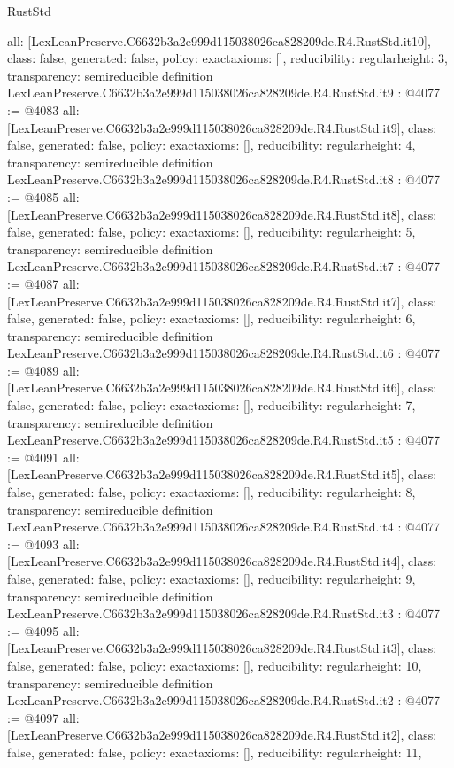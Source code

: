 \begin{lexlean}{RustStd}
\begin{coremodule}
{  all: [LexLeanPreserve.C6632b3a2e999d115038026ca828209de.R4.RustStd.it10],
  class: false,
  generated: false,
  policy: exact{axioms: []},
  reducibility: regular{height: 3},
  transparency: semireducible
}
definition LexLeanPreserve.C6632b3a2e999d115038026ca828209de.R4.RustStd.it9 : @4077 := @4083 {
  all: [LexLeanPreserve.C6632b3a2e999d115038026ca828209de.R4.RustStd.it9],
  class: false,
  generated: false,
  policy: exact{axioms: []},
  reducibility: regular{height: 4},
  transparency: semireducible
}
definition LexLeanPreserve.C6632b3a2e999d115038026ca828209de.R4.RustStd.it8 : @4077 := @4085 {
  all: [LexLeanPreserve.C6632b3a2e999d115038026ca828209de.R4.RustStd.it8],
  class: false,
  generated: false,
  policy: exact{axioms: []},
  reducibility: regular{height: 5},
  transparency: semireducible
}
definition LexLeanPreserve.C6632b3a2e999d115038026ca828209de.R4.RustStd.it7 : @4077 := @4087 {
  all: [LexLeanPreserve.C6632b3a2e999d115038026ca828209de.R4.RustStd.it7],
  class: false,
  generated: false,
  policy: exact{axioms: []},
  reducibility: regular{height: 6},
  transparency: semireducible
}
definition LexLeanPreserve.C6632b3a2e999d115038026ca828209de.R4.RustStd.it6 : @4077 := @4089 {
  all: [LexLeanPreserve.C6632b3a2e999d115038026ca828209de.R4.RustStd.it6],
  class: false,
  generated: false,
  policy: exact{axioms: []},
  reducibility: regular{height: 7},
  transparency: semireducible
}
definition LexLeanPreserve.C6632b3a2e999d115038026ca828209de.R4.RustStd.it5 : @4077 := @4091 {
  all: [LexLeanPreserve.C6632b3a2e999d115038026ca828209de.R4.RustStd.it5],
  class: false,
  generated: false,
  policy: exact{axioms: []},
  reducibility: regular{height: 8},
  transparency: semireducible
}
definition LexLeanPreserve.C6632b3a2e999d115038026ca828209de.R4.RustStd.it4 : @4077 := @4093 {
  all: [LexLeanPreserve.C6632b3a2e999d115038026ca828209de.R4.RustStd.it4],
  class: false,
  generated: false,
  policy: exact{axioms: []},
  reducibility: regular{height: 9},
  transparency: semireducible
}
definition LexLeanPreserve.C6632b3a2e999d115038026ca828209de.R4.RustStd.it3 : @4077 := @4095 {
  all: [LexLeanPreserve.C6632b3a2e999d115038026ca828209de.R4.RustStd.it3],
  class: false,
  generated: false,
  policy: exact{axioms: []},
  reducibility: regular{height: 10},
  transparency: semireducible
}
definition LexLeanPreserve.C6632b3a2e999d115038026ca828209de.R4.RustStd.it2 : @4077 := @4097 {
  all: [LexLeanPreserve.C6632b3a2e999d115038026ca828209de.R4.RustStd.it2],
  class: false,
  generated: false,
  policy: exact{axioms: []},
  reducibility: regular{height: 11},
}
\end{coremodule}
\end{lexlean}
